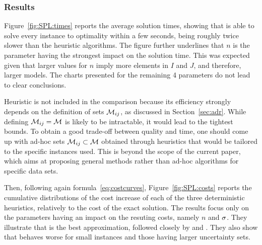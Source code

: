 \documentclass[12pt]{article}
\begin{document}
\subsubsection{Results}

Figure~\ref{fig:SPL:times} reports the average solution times, showing that \exact{} is able to solve every instance to optimality within a few seconds, being roughly twice slower than the heuristic algorithms. The figure further underlines that $n$ is the parameter having the strongest impact on the solution time. This was expected given that larger values for $n$ imply more elements in $I$ and $J$, and therefore, larger models. The charts presented for the remaining 4 parameters do not lead to clear conclusions. 

Heuristic \cons{} is not included in the comparison because its efficiency strongly depends on the definition of sets $\mathcal{M}_{ij}$, as discussed in Section~\ref{sec:adr}. While defining $\mathcal{M}_{ij}=\mathcal{M}$ is likely to be intractable, it would lead to the tightest bounds. To obtain a good trade-off between quality and time, one should come up with ad-hoc sets $\mathcal{M}_{ij}\subset\mathcal{M}$ obtained through heuristics that would be tailored to the specific instances used. This is beyond the scope of the current paper, which aims at proposing general methods rather than ad-hoc algorithms for specific data sets.%

Then, following again formula~\eqref{eq:costcurves}, Figure~\ref{fig:SPL:costs} reports the cumulative distributions of the cost increase of each of the three deterministic heuristics, relatively to the cost of the exact solution. %
The results focus only on the parameters having an impact on the resuting costs, namely $n$ and $\sigma$. They illustrate that \avg{} is the best approximation, followed closely by \worst{} and \hcenter{}. They also show that \hcenter{} behaves worse for small instances and those having larger uncertainty sets.
\end{document}

